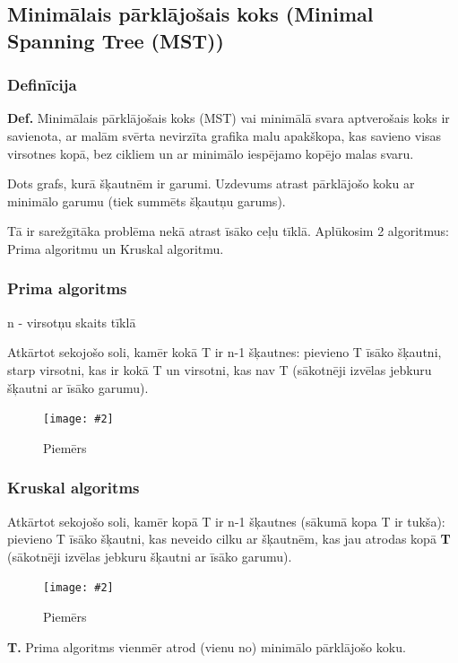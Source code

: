 \documentclass{article}
\newcommand{\illustration}[3]{
	\begin{figure}[H]
		\centering	
		\texttt{[image: \#2]}
		\caption{#3}
	\end{figure}
}
\begin{document}
\subsection{Minimālais pārklājošais koks (Minimal Spanning Tree (MST))}

\subsubsection{Definīcija}

\textbf{Def.} Minimālais pārklājošais koks (MST) vai minimālā svara aptverošais koks ir savienota, ar malām svērta nevirzīta grafika malu apakškopa, kas savieno visas virsotnes kopā, bez cikliem un ar minimālo iespējamo kopējo malas svaru.

Dots grafs, kurā šķautnēm ir garumi. Uzdevums atrast pārklājošo koku ar minimālo garumu (tiek summēts šķautņu garums).

Tā ir sarežgītāka problēma nekā atrast īsāko ceļu tīklā. Aplūkosim 2 algoritmus: Prima algoritmu un Kruskal algoritmu.

\subsubsection{Prima algoritms}
n - virsotņu skaits tīklā

Atkārtot sekojošo soli, kamēr kokā T ir n-1 šķautnes: pievieno T īsāko šķautni, starp virsotni, kas ir kokā T un virsotni, kas nav T (sākotnēji izvēlas jebkuru šķautni ar īsāko garumu).

\illustration{1}{prima-1}{Piemērs}

\subsubsection{Kruskal algoritms}

Atkārtot sekojošo soli, kamēr kopā T ir n-1 šķautnes (sākumā kopa T ir tukša): pievieno T īsāko šķautni, kas neveido cilku ar šķautnēm, kas jau atrodas kopā \textbf{T  }(sākotnēji izvēlas jebkuru šķautni ar īsāko garumu).

\illustration{1}{kruskal-1}{Piemērs}

\textbf{T. } Prima algoritms vienmēr atrod (vienu no) minimālo pārklājošo koku.
\end{document}

